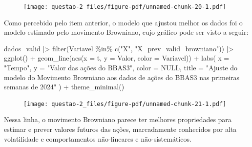 \documentclass[
  letterpaper,
  DIV=11,
  numbers=noendperiod]{scrreprt}
\newenvironment{Shaded}{\begin{snugshade}}{\end{snugshade}}
\newcommand{\AttributeTok}[1]{\textcolor[rgb]{0.40,0.45,0.13}{#1}}
\newcommand{\ConstantTok}[1]{\textcolor[rgb]{0.56,0.35,0.01}{#1}}
\newcommand{\FunctionTok}[1]{\textcolor[rgb]{0.28,0.35,0.67}{#1}}
\newcommand{\NormalTok}[1]{\textcolor[rgb]{0.00,0.23,0.31}{#1}}
\newcommand{\SpecialCharTok}[1]{\textcolor[rgb]{0.37,0.37,0.37}{#1}}
\newcommand{\StringTok}[1]{\textcolor[rgb]{0.13,0.47,0.30}{#1}}
\begin{document}
\begin{figure}[H]

{\centering \texttt{[image: questao-2\_files/figure-pdf/unnamed-chunk-20-1.pdf]}

}

\end{figure}

Como percebido pelo item anterior, o modelo que ajustou melhor os dados
foi o modelo estimado pelo movimento Browniano, cujo gráfico pode ser
visto a seguir:

\begin{Shaded}
\begin{Highlighting}[]
\NormalTok{dados\_valid }\SpecialCharTok{|\textgreater{}}
    \FunctionTok{filter}\NormalTok{(Variavel }\SpecialCharTok{\%in\%} \FunctionTok{c}\NormalTok{(}\StringTok{"X"}\NormalTok{, }\StringTok{"X\_prev\_valid\_browniano"}\NormalTok{)) }\SpecialCharTok{|\textgreater{}}
    \FunctionTok{ggplot}\NormalTok{() }\SpecialCharTok{+}
    \FunctionTok{geom\_line}\NormalTok{(}\FunctionTok{aes}\NormalTok{(}\AttributeTok{x =}\NormalTok{ t, }\AttributeTok{y =}\NormalTok{ Valor, }\AttributeTok{color =}\NormalTok{ Variavel)) }\SpecialCharTok{+}
    \FunctionTok{labs}\NormalTok{(}
        \AttributeTok{x =} \StringTok{"Tempo"}\NormalTok{,}
        \AttributeTok{y =} \StringTok{"Valor das ações do BBAS3"}\NormalTok{,}
        \AttributeTok{color =} \ConstantTok{NULL}\NormalTok{,}
        \AttributeTok{title =} \StringTok{"Ajuste do modelo do Movimento Browniano aos dados}
\StringTok{          de ações do BBAS3 nas primeiras semanas de 2024"}
\NormalTok{    ) }\SpecialCharTok{+}
    \FunctionTok{theme\_minimal}\NormalTok{()}
\end{Highlighting}
\end{Shaded}

\begin{figure}[H]

{\centering \texttt{[image: questao-2\_files/figure-pdf/unnamed-chunk-21-1.pdf]}

}

\end{figure}

Nessa linha, o movimento Browniano parece ter melhores propriedades para
estimar e prever valores futuros das ações, marcadamente conhecidos por
alta volatilidade e comportamentos não-lineares e não-sistemáticos.



\printindex
\end{document}
